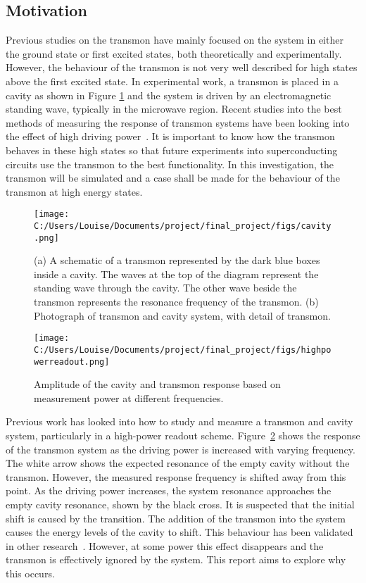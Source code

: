 \documentclass[11pt]{article}
\begin{document}
\subsection{Motivation}
Previous studies on the transmon have mainly focused on the system in either the ground state or first excited states, both theoretically and experimentally. However, the behaviour of the transmon is not very well described for high states above the first excited state. In experimental work, a transmon is placed in a cavity as shown in Figure \ref{fig:picture2} and the system is driven by an electromagnetic standing wave, typically in the microwave region. Recent studies into the best methods of measuring the response of transmon systems have been looking into the effect of high driving power~\cite{reedHighFidelityReadoutCircuit2010}. It is important to know how the transmon behaves in these high states so that future experiments into superconducting circuits use the transmon to the best functionality. In this investigation, the transmon will be simulated and a case shall be made for the behaviour of the transmon at high energy states.
\begin{figure}[ht]
\centering
\texttt{[image: C:/Users/Louise/Documents/project/final\_project/figs/cavity.png]}
\caption{(a) A schematic of a transmon represented by the dark blue boxes inside a cavity. The waves at the top of the diagram represent the standing wave through the cavity. The other wave beside the transmon represents the resonance frequency of the transmon. (b) Photograph of transmon and cavity system, with detail of transmon.}
\label{fig:picture2}
\end{figure}
\begin{figure}[ht]
\centering
\texttt{[image: C:/Users/Louise/Documents/project/final\_project/figs/highpowerreadout.png]}
\caption{Amplitude of the cavity and transmon response based on measurement power at different frequencies.}
\label{fig:picture3}
\end{figure}
Previous work has looked into how to study and measure a transmon and cavity system, particularly in a high-power readout scheme. Figure~\ref{fig:picture3} shows the response of the transmon system as the driving power is increased with varying frequency. The white arrow shows the expected resonance of the empty cavity without the transmon. However, the measured response frequency is shifted away from this point. As the driving power increases, the system resonance approaches the empty cavity resonance, shown by the black cross. It is suspected that the initial shift is caused by the transition. The addition of the transmon into the system causes the energy levels of the cavity to shift. This behaviour has been validated in other research~\cite{bishopResponseStronglyDriven2010,paikObservationHighCoherence2011,elliottApplicationsFokkerPlanckEquation2016}. However, at some power this effect disappears and the transmon is effectively ignored by the system. This report aims to explore why this occurs.
\end{document}

